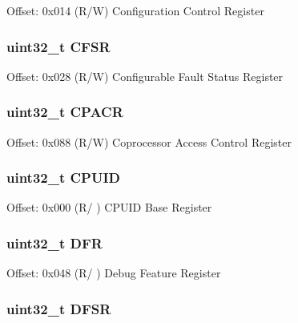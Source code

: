 Offset\-: 0x014 (R/\-W) Configuration Control Register \hypertarget{struct_s_c_b___type_ae6b1e9cde3f94195206c016214cf3936}{
\subsubsection[{C\-F\-S\-R}]{ uint32\-\_\-t C\-F\-S\-R}}\label{struct_s_c_b___type_ae6b1e9cde3f94195206c016214cf3936}
Offset\-: 0x028 (R/\-W) Configurable Fault Status Register \hypertarget{struct_s_c_b___type_acccaf5688449c8253e9952ddc2161528}{
\subsubsection[{C\-P\-A\-C\-R}]{ uint32\-\_\-t C\-P\-A\-C\-R}}\label{struct_s_c_b___type_acccaf5688449c8253e9952ddc2161528}
Offset\-: 0x088 (R/\-W) Coprocessor Access Control Register \hypertarget{struct_s_c_b___type_a30abfea43143a424074f682bd61eace0}{
\subsubsection[{C\-P\-U\-I\-D}]{ uint32\-\_\-t C\-P\-U\-I\-D}}\label{struct_s_c_b___type_a30abfea43143a424074f682bd61eace0}
Offset\-: 0x000 (R/ ) C\-P\-U\-I\-D Base Register \hypertarget{struct_s_c_b___type_a1b9a71780ae327f1f337a2176b777618}{
\subsubsection[{D\-F\-R}]{ uint32\-\_\-t D\-F\-R}}\label{struct_s_c_b___type_a1b9a71780ae327f1f337a2176b777618}
Offset\-: 0x048 (R/ ) Debug Feature Register \hypertarget{struct_s_c_b___type_a415598d9009bb3ffe9f35e03e5a386fe}{
\subsubsection[{D\-F\-S\-R}]{ uint32\-\_\-t D\-F\-S\-R}}\label{struct_s_c_b___type_a415598d9009bb3ffe9f35e03e5a386fe}
